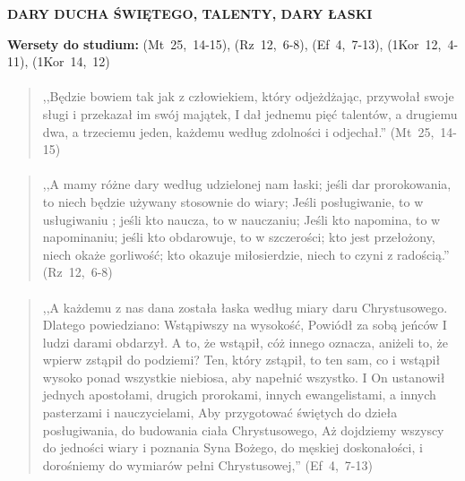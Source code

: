 \documentclass[10pt,a4paper,oneside]{article}
\begin{document}
\centerline{\textbf{\MakeUppercase{Dary Ducha Świętego, talenty, dary łaski}}}
\begin{center}
\textbf{Wersety do studium:} 
\mbox{(Mt 25, 14-15)}, \mbox{(Rz 12, 6-8)}, \mbox{(Ef 4, 7-13)}, \mbox{(1Kor 12, 4-11)}, \mbox{(1Kor 14, 12)}
\end{center}
\paragraph{}
\begin{quote}
,,Będzie bowiem tak jak z człowiekiem, który odjeżdżając, przywołał swoje sługi i przekazał im swój majątek, I dał jednemu pięć talentów, a drugiemu dwa, a trzeciemu jeden, każdemu według zdolności i odjechał.'' \mbox{(Mt 25, 14-15)}
\end{quote}
\paragraph{}
\begin{quote}
,,A mamy różne dary według udzielonej nam łaski; jeśli dar prorokowania, to niech będzie używany stosownie do wiary; Jeśli posługiwanie, to w usługiwaniu ; jeśli kto naucza, to w nauczaniu; Jeśli kto napomina, to w napominaniu; jeśli kto obdarowuje, to w szczerości; kto jest przełożony, niech okaże gorliwość; kto okazuje miłosierdzie, niech to czyni z radością.'' \mbox{(Rz 12, 6-8)}
\end{quote}
\paragraph{}
\begin{quote}
,,A każdemu z nas dana została łaska według miary daru Chrystusowego. Dlatego powiedziano: Wstąpiwszy na wysokość, Powiódł za sobą jeńców I ludzi darami obdarzył. A to, że wstąpił, cóż innego oznacza, aniżeli to, że wpierw zstąpił do podziemi? Ten, który zstąpił, to ten sam, co i wstąpił wysoko ponad wszystkie niebiosa, aby napełnić wszystko. I On ustanowił jednych apostołami, drugich prorokami, innych ewangelistami, a innych pasterzami i nauczycielami, Aby przygotować świętych do dzieła posługiwania, do budowania ciała Chrystusowego, Aż dojdziemy wszyscy do jedności wiary i poznania Syna Bożego, do męskiej doskonałości, i dorośniemy do wymiarów pełni Chrystusowej,'' \mbox{(Ef 4, 7-13)}
\end{quote}
\end{document}
